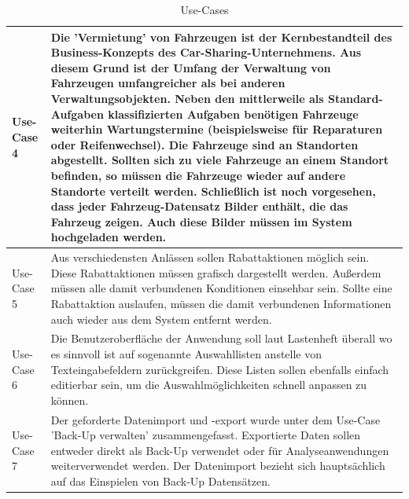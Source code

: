 \begin{table}[ht]

    \begin{onehalfspace}

    \begin{tabular}{l | p{12.5cm}}
        \hline
        Use-Case 4 & Die 'Vermietung' von Fahrzeugen ist der Kernbestandteil des Business-Konzepts des Car-Sharing-Unternehmens. Aus diesem Grund ist der Umfang der Verwaltung von Fahrzeugen umfangreicher als bei anderen Verwaltungsobjekten. Neben den mittlerweile als Standard-Aufgaben klassifizierten Aufgaben benötigen Fahrzeuge weiterhin Wartungstermine (beispielsweise für Reparaturen oder Reifenwechsel). Die Fahrzeuge sind an Standorten abgestellt. Sollten sich zu viele Fahrzeuge an einem Standort befinden, so müssen die Fahrzeuge wieder auf andere Standorte verteilt werden. Schließlich ist noch vorgesehen, dass jeder Fahrzeug-Datensatz Bilder enthält, die das Fahrzeug zeigen. Auch diese Bilder müssen im System hochgeladen werden. \\
        \hline
        Use-Case 5 & Aus verschiedensten Anlässen sollen Rabattaktionen möglich sein. Diese Rabattaktionen müssen grafisch dargestellt werden. Außerdem müssen alle damit verbundenen Konditionen einsehbar sein. Sollte eine Rabattaktion auslaufen, müssen die damit verbundenen Informationen auch wieder aus dem System entfernt werden.\\
        \hline
        Use-Case 6 & Die Benutzeroberfläche der Anwendung soll laut Lastenheft überall wo es sinnvoll ist auf sogenannte Auswahllisten anstelle von Texteingabefeldern zurückgreifen. Diese Listen sollen ebenfalls einfach editierbar sein, um die Auswahlmöglichkeiten schnell anpassen zu können.\\
        \hline
        Use-Case 7 & Der geforderte Datenimport und -export wurde unter dem Use-Case 'Back-Up verwalten' zusammengefasst. Exportierte Daten sollen entweder direkt als Back-Up verwendet oder für Analyseanwendungen weiterverwendet werden. Der Datenimport bezieht sich hauptsächlich auf das Einspielen von Back-Up Datensätzen.\\
        \hline
    \end{tabular}
    \caption{Use-Cases}
    \label{tbl:usecases2}

    \end{onehalfspace}
\end{table}

\clearpage

